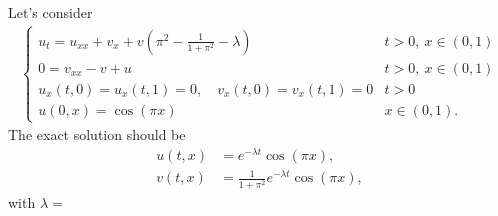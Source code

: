 \documentclass[12pt]{article} %
\begin{document}


Let's consider
\begin{align*}
  \begin{cases}
    u_t = u_{xx} + v_x + v \left(\pi^2 -\frac{1}{1+\pi^2}-\lambda\right) & t>0,\: x\in (0,1) \\
    0 = v_{xx} - v + u                                                   & t>0,\: x\in (0,1) \\
    u_x(t,0) = u_x(t,1) = 0, \quad v_x(t,0) = v_x(t,1) = 0               & t>0               \\
    u(0,x) = \cos(\pi x)                                                 & x \in (0,1).
  \end{cases}
\end{align*}
The exact solution should be
\begin{align*}
  u(t,x) & = e^{-\lambda t} \cos(\pi x),                  \\
  v(t,x) & = \frac{1}{1+\pi^2} e^{-\lambda t} \cos(\pi x),
\end{align*}
with $\lambda =   $



\end{document}
